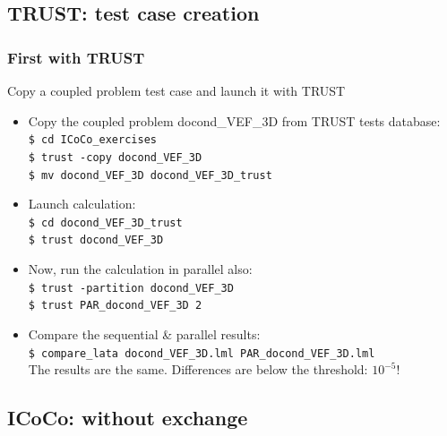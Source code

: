\documentclass[10pt, hyperref={unicode=true,pdfusetitle, bookmarks=true,bookmarksnumbered=false,bookmarksopen=false, breaklinks=false,pdfborder={0 0 1},backref=true,colorlinks=true,linkcolor=darkblue,pageanchor, urlcolor=darkblue}]{beamer}
\begin{document}
\subsection{{\bf{TRUST: test case creation}}}
\begin{frame}
\end{frame}
\begin{frame}
\frametitle{First with TRUST}

\begin{block}{Copy a coupled problem test case and launch it with TRUST}
\begin{itemize}
\item Copy the coupled problem docond\_VEF\_3D from TRUST tests database:\\
\texttt{\$ cd ICoCo\_exercises}\\
\texttt{\$ trust -copy docond\_VEF\_3D}\\
\texttt{\$ mv docond\_VEF\_3D docond\_VEF\_3D\_trust}
\item Launch calculation:\\
\texttt{\$ cd docond\_VEF\_3D\_trust}\\
\texttt{\$ trust docond\_VEF\_3D}
\item Now, run the calculation in parallel also:\\
\texttt{\$ trust -partition docond\_VEF\_3D}\\
\texttt{\$ trust PAR\_docond\_VEF\_3D 2}\\
\item Compare the sequential \& parallel results:\\
\texttt{\$ compare\_lata docond\_VEF\_3D.lml PAR\_docond\_VEF\_3D.lml}\\
The results are the same. Differences are below the threshold: $10^{-5}$!
\end{itemize}
\end{block}

\end{frame}
\subsection{{\bf{ICoCo: without exchange}}}
\begin{frame}
\end{frame}
\end{document}
